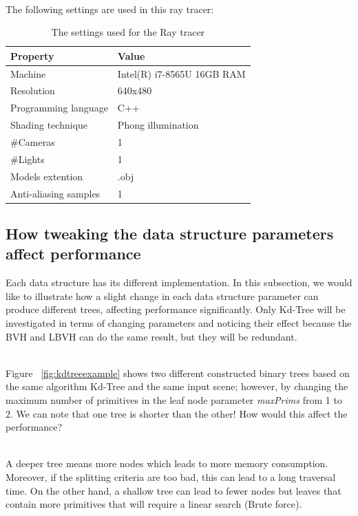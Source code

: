\documentclass[11pt,a4paper]{article}
\begin{document}
\noindent
\\
The following settings are used in this ray tracer:

\newcommand\T{\rule{0pt}{2.6ex}}       %
\newcommand\B{\rule[-1.2ex]{0pt}{0pt}} %

\begin{table}[H] 
\centering 
{\footnotesize
\begin{tabular}{ P{7cm} P{7cm} }      %
\hline \hline
Property & Value \T\B  \\
\hline \hline
Machine & Intel(R) i7-8565U 16GB RAM\T\B
\\    
\hline
Resolution & 640x480  \T\B
\\
 \hline
Programming language & C++  \T\B 
\\ 
 \hline
Shading technique & Phong illumination \T\B 
\\
 \hline
\#Cameras & 1 \T\B 
\\
\#Lights & 1  \T\B 
\\ 
 \hline
 Models extention& .obj \T\B 
\\ 
 \hline
Anti-aliasing samples & 1 \T\B 
\\ 
\hline \hline
    \end{tabular}
}
  \caption{The settings used for the Ray tracer}
\end{table}

\subsection{How tweaking the data structure parameters affect performance}
Each data structure has its different implementation. In this subsection, we would like to illustrate how a slight change in each data structure parameter can produce different trees, affecting performance significantly. Only Kd-Tree will be investigated in terms of changing parameters and noticing their effect because the BVH and LBVH can do the same result, but they will be redundant.

\noindent
\\
Figure ~\ref{fig:kdtreeexample} shows two different constructed binary trees based on the same algorithm Kd-Tree and the same input scene; however, by changing the maximum number of primitives in the leaf node parameter \textit{maxPrims} from 1 to 2. We can note that one tree is shorter than the other! How would this affect the performance? 

\noindent
\\
A deeper tree means more nodes which leads to more memory consumption. Moreover, if the splitting criteria are too bad, this can lead to a long traversal time. On the other hand, a shallow tree can lead to fewer nodes but leaves that contain more primitives that will require a linear search (Brute force). 
\end{document}
